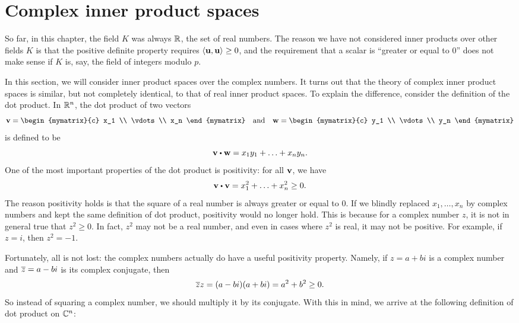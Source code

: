 \section{Complex inner product spaces}

So far, in this chapter, the field $K$ was always $\mathbb{R}$, the set of
real numbers.  The reason we have not considered inner products over
other fields $K$ is that the positive definite property requires
$\iprod{\vect{u},\vect{u}}\geq 0$, and the requirement that a scalar
is ``greater or equal to 0'' does not make sense if $K$ is, say, the
field of integers modulo $p$.

In this section, we will consider inner product spaces over the
complex numbers. It turns out that the theory of complex inner product
spaces is similar, but not completely identical, to that of real inner
product spaces. To explain the difference, consider the definition of
the dot product. In $\mathbb{R}^n$, the dot product of two vectors
\begin{equation*}
  \vect{v}=\begin{mymatrix}{c} x_1 \\ \vdots \\ x_n \end{mymatrix}
  \quad\mbox{and}\quad
  \vect{w}=\begin{mymatrix}{c} y_1 \\ \vdots \\ y_n \end{mymatrix}
\end{equation*}
is defined to be
\begin{equation*}
  \vect{v}\dotprod \vect{w} = x_1y_1 + \ldots + x_ny_n.
\end{equation*}
One of the most important properties of the dot product is positivity:
for all $\vect{v}$, we have
\begin{equation*}
  \vect{v}\dotprod\vect{v} = x_1^2 + \ldots + x_n^2\geq 0.
\end{equation*}
The reason positivity holds is that the square of a real number is
always greater or equal to 0. If we blindly replaced $x_1,\ldots,x_n$
by complex numbers and kept the same definition of dot product,
positivity would no longer hold. This is because for a complex number
$z$, it is not in general true that $z^2\geq 0$. In fact, $z^2$ may
not be a real number, and even in cases where $z^2$ is real, it may
not be positive. For example, if $z=i$, then $z^2=-1$.

Fortunately, all is not lost: the complex numbers actually do have a
useful positivity property. Namely, if $z=a+bi$ is a complex number
and $\overline{z}=a-bi$ is its complex conjugate, then
\begin{equation*}
  \overline{z}z = (a-bi)(a+bi) = a^2 + b^2 \geq 0.
\end{equation*}
So instead of squaring a complex number, we should multiply it by its
conjugate. With this in mind, we arrive at the following definition of
dot product on $\mathbb{C}^n$:


